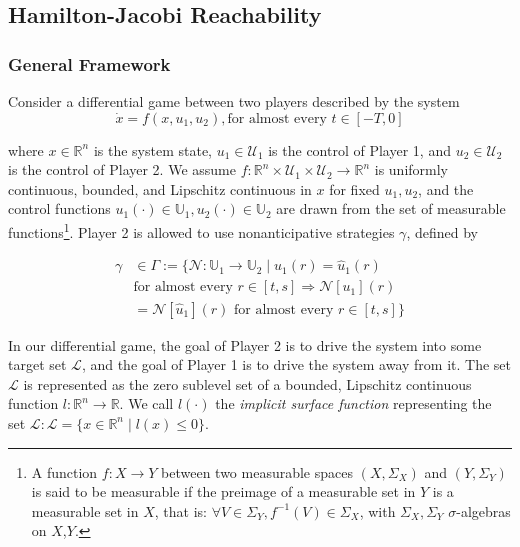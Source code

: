 \subsection{Hamilton-Jacobi Reachability}
\subsubsection{General Framework}
Consider a differential game between two players described by the system
\begin{equation}
\dot{x} = f(x, u_1, u_2), \text{for almost every }t\in [-T,0]
\end{equation}

\noindent where $x\in\mathbb{R}^n$ is the system state, $u_1\in \mathcal{U}_1$ is the control of Player 1, and $u_2\in\mathcal{U}_2$ is the control of Player 2. We assume $f:\mathbb{R}^n\times \mathcal{U}_1 \times \mathcal{U}_2 \rightarrow \mathbb{R}^n$ is uniformly continuous, bounded, and Lipschitz continuous in $x$ for fixed $u_1,u_2$, and the control functions $u_1(\cdot)\in\mathbb{U}_1,u_2(\cdot)\in\mathbb{U}_2$ are drawn from the set of measurable functions\footnote{
A function $f:X\to Y$ between two measurable spaces $(X,\Sigma_X)$ and $(Y,\Sigma_Y)$ is said to be measurable if the preimage of a measurable set in $Y$ is a measurable set in $X$, that is: $\forall V\in\Sigma_Y, f^{-1}(V)\in\Sigma_X$, with $\Sigma_X,\Sigma_Y$ $\sigma$-algebras on $X$,$Y$.}. Player 2 is allowed to use nonanticipative strategies \cite{Evans84,Varaiya67} $\gamma$, defined by

\begin{equation}
\begin{aligned}
\gamma &\in \Gamma := \{\mathcal{N}: \mathbb{U}_1 \rightarrow \mathbb{U}_2 \mid  u_1(r) = \hat{u}_1(r) \\
&\text{for almost every } r\in[t,s] \Rightarrow \mathcal{N}[u_1](r) \\
&= \mathcal{N}[\hat{u}_1](r) \text{ for almost every } r\in[t,s]\}
\end{aligned}
\end{equation}

In our differential game, the goal of Player 2 is to drive the system into some target set $\mathcal{L}$, and the goal of Player 1 is to drive the system away from it. The set $\mathcal{L}$ is represented as the zero sublevel set of a bounded, Lipschitz continuous function $l:\mathbb{R}^n\rightarrow\mathbb{R}$. We call $l(\cdot)$ the \textit{implicit surface function} representing the set $\mathcal L: \mathcal{L}=\{x\in\mathbb{R}^n \mid l(x)\le 0\}$.

